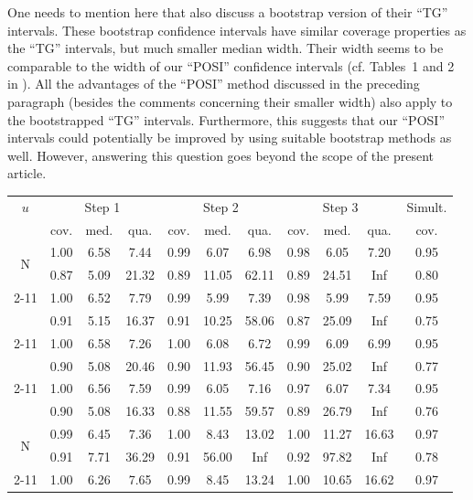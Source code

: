 \documentclass[preprint]{imsart}
\numberwithin{equation}{section}
\begin{document}
One needs to mention here that \cite{Tib15a} also discuss a bootstrap version of their ``TG'' intervals. These bootstrap confidence intervals have similar coverage properties as the ``TG'' intervals, but much smaller median width. Their width seems to be comparable to the width of our ``POSI'' confidence intervals (cf. Tables~1 and 2 in \cite{Tib15a}). All the advantages of the ``POSI'' method discussed in the preceding paragraph (besides the comments concerning their smaller width) also apply to the bootstrapped ``TG'' intervals. Furthermore, this suggests that our ``POSI'' intervals could potentially be improved by using suitable bootstrap methods as well. However, answering this question goes beyond the scope of the present article.


\begin{table}[h]
\begin{center}
\begin{tabular}{c|ccc|ccc|ccc|c}
$u$ & \multicolumn{3}{c}{Step 1} \vline & \multicolumn{3}{c}{Step 2} \vline & \multicolumn{3}{c}{Step 3}  & Simult. \\ 
& cov. & med. &  qua. & cov. & med. &  qua. & cov. & med. &  qua.  & cov. \\  \hline\hline
\multirow{2}{*}{N} &  1.00 & 6.58 & 7.44 & 0.99 & 6.07 & 6.98 & 0.98 & 6.05 & 7.20 & 0.95 \\ 
& 0.87 & 5.09 & 21.32 & 0.89 & 11.05 & 62.11 & 0.89 & 24.51 & Inf & 0.80 \\ \cline{2-11}
\multirow{2}{*}{L} & 1.00 & 6.52 & 7.79 & 0.99 & 5.99 & 7.39 & 0.98 & 5.99 & 7.59 & 0.95 \\
& 0.91 & 5.15 & 16.37 & 0.91 & 10.25 & 58.06 & 0.87 & 25.09 & Inf & 0.75 \\  \cline{2-11}
\multirow{2}{*}{U}  & 1.00 & 6.58 & 7.26 & 1.00 & 6.08 & 6.72 & 0.99 & 6.09 & 6.99 & 0.95 \\
& 0.90 & 5.08 & 20.46 & 0.90 & 11.93 & 56.45 & 0.90 & 25.02 & Inf & 0.77 \\  \cline{2-11}
\multirow{2}{*}{SN}  &  1.00& 6.56&  7.59 &0.99&  6.05 & 7.16 &0.97  & 6.07&  7.34 & 0.95\\
& 0.90 & 5.08 &16.33& 0.88 &11.55& 59.57& 0.89  &26.79&   Inf & 0.76 \\ \hline\hline
\multirow{2}{*}{N}  & 0.99 & 6.45 & 7.36 &1.00 & 8.43& 13.02 &1.00 & 11.27 &16.63 & 0.97 \\
& 0.91 & 7.71 & 36.29 & 0.91 & 56.00 & Inf & 0.92 & 97.82 & Inf & 0.78  \\ \cline{2-11}
\multirow{2}{*}{L}  & 1.00 & 6.26 & 7.65 & 0.99 & 8.45 & 13.24 & 1.00 & 10.65 & 16.62 & 0.97 \\

\end{tabular}
\end{center}
\end{table}
\end{document}

